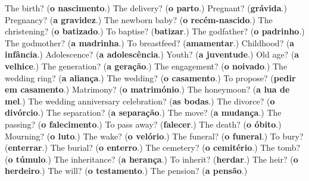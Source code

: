 \begin{tcolorbox}[breakable,colback=teal!4,colframe=teal!35!black,title={Before you move on}]
The birth? (\textbf{o nascimento}.) The delivery? (\textbf{o parto}.) Pregnant? (\textbf{grávida}.) Pregnancy? (\textbf{a gravidez}.) The newborn baby? (\textbf{o recém-nascido}.) The christening? (\textbf{o batizado}.) To baptise? (\textbf{batizar}.) The godfather? (\textbf{o padrinho}.) The godmother? (\textbf{a madrinha}.) To breastfeed? (\textbf{amamentar}.) Childhood? (\textbf{a infância}.) Adolescence? (\textbf{a adolescência}.) Youth? (\textbf{a juventude}.) Old age? (\textbf{a velhice}.) The generation? (\textbf{a geração}.) The engagement? (\textbf{o noivado}.) The wedding ring? (\textbf{a aliança}.) The wedding? (\textbf{o casamento}.) To propose? (\textbf{pedir em casamento}.) Matrimony? (\textbf{o matrimónio}.) The honeymoon? (\textbf{a lua de mel}.) The wedding anniversary celebration? (\textbf{as bodas}.) The divorce? (\textbf{o divórcio}.) The separation? (\textbf{a separação}.) The move? (\textbf{a mudança}.) The passing? (\textbf{o falecimento}.) To pass away? (\textbf{falecer}.) The death? (\textbf{o óbito}.) Mourning? (\textbf{o luto}.) The wake? (\textbf{o velório}.) The funeral? (\textbf{o funeral}.) To bury? (\textbf{enterrar}.) The burial? (\textbf{o enterro}.) The cemetery? (\textbf{o cemitério}.) The tomb? (\textbf{o túmulo}.) The inheritance? (\textbf{a herança}.) To inherit? (\textbf{herdar}.) The heir? (\textbf{o herdeiro}.) The will? (\textbf{o testamento}.) The pension? (\textbf{a pensão}.)
\end{tcolorbox}
